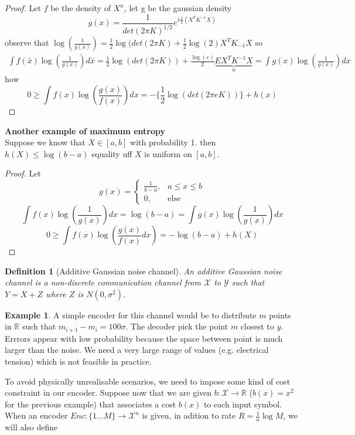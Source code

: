 \documentclass{article}
\newtheorem{definition}{Definition}[section]
\theoremstyle{definition} %
\newtheorem{example}{Example}
\def\X{\mathcal{X}}
\def\Y{\mathcal{Y}}
\def\R{\mathbb{R}}
\begin{document}
\begin{proof}
  Let $f$ be the density of $X^n$, let g be the gaussian density
  \[
    g(x) = \frac{1}{det(2 \pi K)^{1/2}} e^{1 \frac{1}{2}(X^T K^{-1} X)}
  \]
  observe that $\log(\frac{1}{g(x)}) = \frac{1}{2} \log(det(2 \pi K) + \frac{1}{2} \log(2) X^T K_{-1} X$
  so
  \begin{align*}
    \int f(\bar{x}) \log(\frac{1}{g(x)}) d \bar{x} = \frac{1}{2} \log(det(2 \pi K)) + \frac{\log(e)}{2} \underbrace{E{X^T K^{-1} X}}_{n}
    = \int g(x) \log(\frac{1}{g(x)}) dx
  \end{align*}
  how
  \[
    0 \geq \int f(x) \log(\frac{g(x)}{f(x)}) dx = - \{\frac{1}{2} \log(det(2 \pi e K))\} + h(x)
  \]
\end{proof}

\textbf{Another example of maximum entropy} \\
Suppose we know that $X \in [a, b]$ with probability 1. then $h(X) \leq \log(b - a)$ equality uff $X$ is uniform on $[a, b]$.
\begin{proof}
  Let
  \[
    g(x) =
    \left\{
    \begin{array}{cc}
      \frac{1}{b - a} , & a \leq x \leq b \\
      0 , & \text{else}
    \end{array}
    \right.
\]
\[
  \int f(x) \log(\frac{1}{g(x)}) dx = \log(b - a) = \int g(x) \log(\frac{1}{g(x)}) dx
\]
\[
  0 \geq \int f(x) \log(\frac{g(x)}{f(x)} dx) = - \log(b - a) + h(X)
\]
\end{proof}


\begin{definition}[Additive Gaussian noise channel]
  An additive Gaussian noise channel is a non-discrete communication channel from $\X$ to $\Y$ such that $Y=X+Z$ where $Z$ is $N(0,\sigma^2)$.
\end{definition}

\begin{example}
  A simple encoder for this channel would be to distribute $m$ points in $\R$ such that $m_{i+1} - m_i = 100\sigma$. The decoder pick the point $m$ closest to $y$. Errrors appear with low probability because the space between point is much larger than the noise. We need a very large range of values (e.g. electrical tension) which is not feasible in practice.
\end{example}

To avoid physically unrealisable scenarios, we need to impose some kind of cost constraint in our encoder. Suppose now that we are given $b : \X \to \R$ ($b(x) = x^2$ for the previous example) that associates a cost $b(x)$ to each input symbol. When an encoder $Enc: \{ 1 \dots M \} \to \X^n$ is given, in adition to rate $R = \frac 1 n \log M$, we will also define
\end{document}
